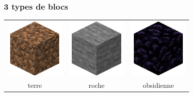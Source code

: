 \documentclass[svgnames,11pt]{beamer}
\begin{document}
\begin{frame}
    \frametitle{3 types de blocs}

    \begin{center}
        \begin{tabular}{ccc}
            \includegraphics[width=3cm]{ressources/terre.png} &
            \includegraphics[width=3cm]{ressources/roche.png} &
            \includegraphics[width=3cm]{ressources/obsidienne.png}                 \\
            terre                                             & roche & obsidienne \\
        \end{tabular}
    \end{center}

\end{frame}
\end{document}
